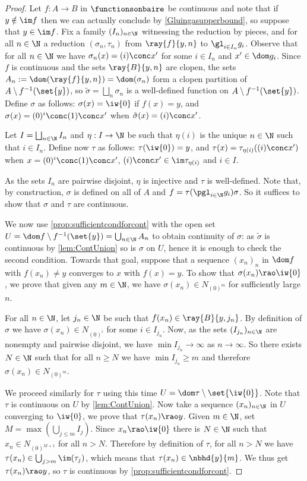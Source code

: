 \begin{proof}
Let $f:A\to B$ in $\functionsonbaire$ be continuous and note that if $y\notin\im f$ then we can actually conclude by \cref{Gluingasupperbound}, so suppose that $y\in\im f$.
Fix a family $(I_n)_{n\in\N}$ witnessing the reduction by pieces, and for all $n\in\N$ a reduction $(\sigma_n, \tau_n)$ from $\ray{f}{y,n}$ to $\gl_{i\in I_n}g_i$.
Observe that for all $n\in\N$ we have $\sigma_n(x)=(i)\conc x'$ for some $i\in I_n$ and $x'\in \dom g_i$.
Since $f$ is continuous and the sets $\ray{B}{y,n}$ are clopen, the sets $A_n:=\dom(\ray{f}{y,n})=\dom(\sigma_n)$ form a clopen partition of $A\setminus f^{-1}(\set{y})$,
so $\tilde{\sigma}=\bigsqcup_n\sigma_n$ is a well-defined function on $A\setminus f^{-1}(\set{y})$.
Define $\sigma$ as follows: $\sigma(x)=\iw{0}$ if $f(x)=y$, and $\sigma(x)=(0)^i\conc(1)\conc x'$ when $\tilde{\sigma}(x)=(i)\conc x'$.

Let $I=\bigsqcup_{n\in\N} I_n$ and $\eta:I\to \N$ be such that $\eta(i)$ is the unique $n\in\N$ such that $i\in I_n$.
Define now $\tau$ as follows: $\tau(\iw{0})=y$, and $\tau(x)=\tau_{\eta(i)}((i)\conc x')$ when $x=(0)^i\conc(1)\conc x'$, $(i)\conc x'\in \im \tau_{\eta(i)}$ and $i\in I$.

As the sets $I_n$ are pairwise disjoint, $\eta$ is injective and $\tau$ is well-defined.
Note that, by construction, $\sigma$ is defined on all of $A$ and $f=\tau(\pgl_{i\in \N}g_i)\sigma$.
So it suffices to show that $\sigma$ and $\tau$ are continuous.

\medskip

We now use \cref{prop:sufficientcondforcont} with the open set $U=\dom f \setminus f^{-1}(\set{y})=\bigcup_{n\in\N}A_n$ to obtain continuity of $\sigma$:
as $\tilde{\sigma}$ is continuous by \cref{lem:ContUnion} so is $\sigma$ on $U$, hence it is enough to check the second condition.
Towards that goal, suppose that a sequence $(x_n)_n$ in $\dom f$ with $f(x_n)\neq y$ converges to $x$ with $f(x)=y$. To show that $\sigma(x_n)\rao\iw{0}$, we prove that given any $m\in\N$, we have $\sigma(x_n)\in N_{(0)^m}$ for sufficiently large $n$.

For all $n\in\N$, let $j_n\in\N$ be such that $f(x_n)\in \ray{B}{y,j_n}$. By definition of $\sigma$ we have $\sigma(x_n)\in N_{(0)^i}$ for some $i\in I_{j_n}$.
Now, as the sets $(I_{j_n})_{n\in\N}$ are nonempty and pairwise disjoint, we have $\min I_{j_n}\to\infty$ as $n\to \infty$.
So there exists $N\in \N$ such that for all $n\geq N$ we have $\min I_{j_n}\geq m$ and therefore $\sigma(x_n)\in N_{(0)^m}$.

We proceed similarly for $\tau$ using this time $U=\dom \tau \setminus\set{\iw{0}}$. Note that $\tau$ is continuous on $U$ by \cref{lem:ContUnion}. 
Now take a sequence $(x_n)_{n\in\N}$ in $U$ converging to $\iw{0}$, we prove that $\tau(x_n)\rao y$. %
Given $m\in\N$, set $M=\max(\bigcup_{j\leq m}I_j)$. Since $x_n\rao\iw{0}$ there is $N\in\N$ such that $x_n\in N_{(0)^{M+1}}$ for all $n>N$.
Therefore by definition of $\tau$, for all $n>N$ we have $\tau(x_n)\in\bigcup_{j>m}\im(\tau_j)$, which means that $\tau(x_n)\in \nbhd{y}{m}$.
We thus get $\tau(x_n)\rao y$, so $\tau$ is continuous by \cref{prop:sufficientcondforcont}.
\end{proof}

